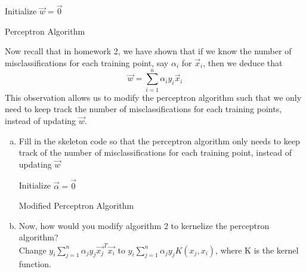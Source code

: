 \documentclass{article}
\begin{document}
	\begin{algorithm}[H]
		\SetAlgoLined

		Initialize $\vec{w} = \vec{0}$ \;
		\caption{Perceptron Algorithm}
	\end{algorithm}
	\noindent
	Now recall that in homework 2, we have shown that if we know the number of misclassifications for each training point, say $\alpha_i$ for $\vec{x}_i$, then we deduce that
	$$\vec{w} = \sum_{i=1}^{n} \alpha_i y_i \vec{x}_i$$ This observation allows us to modify the perceptron algorithm such that we only need to keep track the number of misclassifications for each training points, instead of updating $\vec{w}$.
	\begin{enumerate}[(a)]
		\item Fill in the skeleton code so that the perceptron algorithm only needs to keep track of the number of misclassifications for each training point, instead of updating $\vec{w}$ \\
		\begin{algorithm}[H]
			\SetAlgoLined

			Initialize $\vec{\alpha} = \vec{0}$ \;
			\caption{Modified Perceptron Algorithm}
		\end{algorithm}

		\item Now, how would you modify algorithm 2 to kernelize the perceptron algorithm?\\

		Change $y_i\sum_{j=1}^n\alpha_jy_j\vec{x_j}^T\vec{x_i}$ to $y_i\sum_{j=1}^n\alpha_jy_jK(x_j, x_i)$, where K is the kernel function.

	\end{enumerate}
    \newpage
\end{document}
